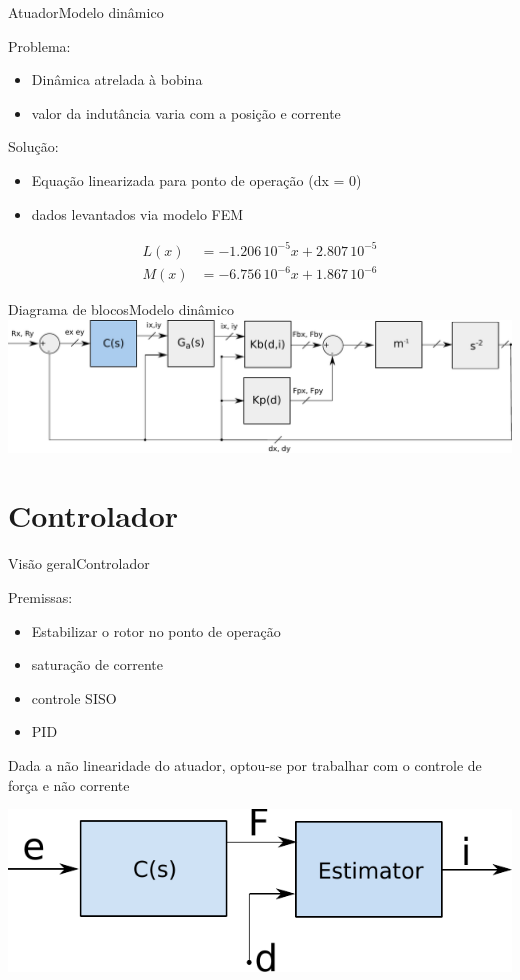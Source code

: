 \documentclass{beamer}
\begin{document}
\begin{frame}{Atuador}{Modelo dinâmico}

Problema:
	\begin{itemize}
		\item Dinâmica atrelada à bobina
		\item valor da indutância varia com a posição e corrente
	\end{itemize}
	
Solução:
	
	\begin{itemize}
	\item Equação linearizada para ponto de operação (dx = 0) 
	\item dados levantados via modelo FEM
	\end{itemize}

	
	\begin{align*}
		L(x) &= -1.206 \,10^{-5} x + 2.807 \, 10^{-5} \\
		M(x) &= -6.756 \,10^{-6} x + 1.867 \, 10^{-6} 
	\end{align*} 
	
\end{frame}

\begin{frame}{Diagrama de blocos}{Modelo dinâmico}
\includegraphics[width=1\linewidth]{Modelagem/diagrama_blocos_modelo_linear}
\end{frame}

\section{Controlador}

\begin{frame}{Visão geral}{Controlador}

Premissas:

\begin{itemize}
\item Estabilizar o rotor no ponto de operação
\item saturação de corrente
\item controle SISO
\item PID
\end{itemize}

Dada a não linearidade do atuador, optou-se por trabalhar com o controle de força e não corrente

\vspace{10px}
\centering
\includegraphics[width=0.5\linewidth]{Modelagem/controlador_estimador}

\end{frame}
\end{document}
